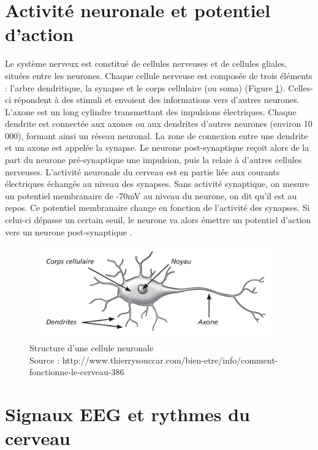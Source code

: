 \section {Activité neuronale et potentiel d'action}
\label{Section: 2.Activité neuronale et potentiel d'action}

Le système nerveux est constitué de cellules nerveuses et de cellules gliales, situées entre les neurones. Chaque cellule nerveuse est composée de trois éléments : l'arbre dendritique, la synapse et le corps cellulaire (ou soma) (Figure \ref*{fig:structure d'un neurone}). Celles-ci répondent à des stimuli et envoient des informations vers d'autres neurones. L'axone est un long cylindre transmettant des impulsions électriques. Chaque dendrite est connectée aux axones ou aux dendrites d'autres neurones (environ 10 000), formant ainsi un réseau neuronal. La zone de connexion entre une dendrite et un axone est appelée la synapse. Le neurone post-synaptique reçoit alors de la part du neurone pré-synaptique une impulsion, puis la relaie à d'autres cellules nerveuses. L'activité neuronale du cerveau est en partie liée aux courants électriques échangés au niveau des synapses. Sans activité synaptique, on mesure un potentiel membranaire de -70mV au niveau du neurone, on dit qu'il est au repos. Ce potentiel membranaire change en fonction de l'activité des synapses. Si celui-ci dépasse un certain seuil, le neurone va alors émettre un potentiel d'action vers un neurone post-synaptique \cite{Saeid}.

\begin{figure}[h]
	\centering\includegraphics[width=11cm,height=4cm]{images/neurone.jpg}
	\caption[Structure d'une cellule neuronale]{Structure d'une cellule neuronale\\Source : http://www.thierrysouccar.com/bien-etre/info/comment-fonctionne-le-cerveau-386}
	\label{fig:structure d'un neurone}
\end{figure}


\section {Signaux EEG et rythmes du cerveau}
\label{Section: 2.Signaux EEG et rythmes du cerveau}

